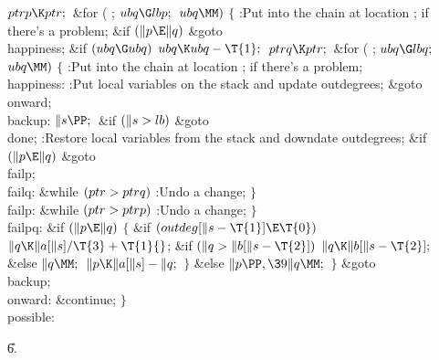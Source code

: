 ${}\\{ptrp}\K\\{ptr};{}$\6
\&{for} ( ; ${}\\{ubq}\G\\{lbp};{}$ ${}\\{ubq}\MM){}$\5
${}\{{}$\1\6
:Put  into the chain at location ;  if there's a problem\X;\6
\&{if} ${}(\|p\E\|q){}$\1\5
\&{goto} \\{happiness};\2\6
\&{if} ${}(\\{ubq}\G\\{ubq}){}$\1\5
${}\\{ubq}\K\\{ubq}-\T{1};{}$\2\6
${}\\{ptrq}\K\\{ptr};{}$\6
\&{for} ( ; ${}\\{ubq}\G\\{lbq};{}$ ${}\\{ubq}\MM){}$\5
${}\{{}$\1\6
:Put  into the chain at location ;  if there's a problem\X;\6
\4\\{happiness}:\5
:Put local variables on the stack and update outdegrees\X;\6
\&{goto} \\{onward};\6
\4\\{backup}:\5
${}\|s\PP;{}$\6
\&{if} ${}(\|s>\\{lb}){}$\1\5
\&{goto} \\{done};\2\6
:Restore local variables from the stack and downdate outdegrees\X;\6
\&{if} ${}(\|p\E\|q){}$\1\5
\&{goto} \\{failp};\2\6
\4\\{failq}:\5
\&{while} ${}(\\{ptr}>\\{ptrq}){}$\1\5
:Undo a change\X;\2\6
\4${}\}{}$\2\6
\4\\{failp}:\5
\&{while} ${}(\\{ptr}>\\{ptrp}){}$\1\5
:Undo a change\X;\2\6
\4${}\}{}$\2\6
\4\\{failpq}:\5
\&{if} ${}(\|p\E\|q){}$\5
${}\{{}$\1\6
\&{if} ${}(\\{outdeg}[\|s-\T{1}]\E\T{0}){}$\1\5
${}\|q\K\|a[\|s]/\T{3}+\T{1}{}$;\2\6
\&{if} ${}(\|q>\|b[\|s-\T{2}]){}$\1\5
${}\|q\K\|b[\|s-\T{2}];{}$\2\6
\&{else}\1\5
${}\|q\MM;{}$\2\6
${}\|p\K\|a[\|s]-\|q;{}$\6
\4${}\}{}$\5
\2\&{else}\1\5
${}\|p\PP,\39\|q\MM;{}$\2\6
\4${}\}{}$\2\6
\&{goto} \\{backup};\6
\4\\{onward}:\5
\&{continue};\6
\4${}\}{}$\2\6
\\{possible}:\par
\U6.\fi

